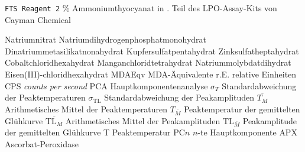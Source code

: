                 {\texttt{FTS Reagent 2}}
                {\unit[3]{\%} Ammoniumthyocyanat in . Teil des LPO-Assay-Kits von Cayman Chemical}
                
                {}
                {Natriumnitrat}
                {}
                {Natriumdihydrogenphosphatmonohydrat}
                {}
                {Dinatriummetasilikatnonahydrat}
                {}
                {Kupfersulfatpentahydrat}
                {}
                {Zinksulfatheptahydrat}
                {}
                {Cobaltchloridhexahydrat}
                {}
                {Manganchloridtetrahydrat}
                {}
                {Natriummolybdatdihydrat}
                {}
                {Eisen(III)-chloridhexahydrat}
                {MDAEqv}
                {MDA-Äquivalente}
                {r.E.}
                {relative Einheiten}
                {CPS}
                {\textit{counts per second}}
                {PCA}
                {Hauptkomponentenanalyse}
                {$\sigma_T$}
                {Standardabweichung der Peaktemperaturen}
                {$\sigma_{\text{TL}}$}
                {Standardabweichung der Peakamplituden}
                {$\overline{T_M}$}
                {Arithmetisches Mittel der Peaktemperaturen}
                {$T_{\overline{M}}$}
                {Peaktemperatur der gemittelten Glühkurve}
                {$\overline{\text{TL}_M}$}
                {Arithmetisches Mittel der Peakamplituden}
                {$\text{TL}_{\overline{M}}$}
                {Peakamplitude der gemittelten Glühkurve}
                {T}
                {Peaktemperatur}
                {PC$n$}
                {$n$-te Hauptkomponente}
                {APX}
                {Ascorbat-Peroxidase}